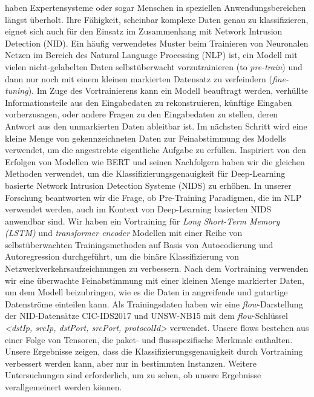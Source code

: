 \documentclass[draft,final]{vutinfth} %
\theoremstyle{break}
\begin{document}
\begin{kurzfassung}
haben Expertensysteme oder sogar Menschen in speziellen Anwendungsbereichen längst überholt. Ihre Fähigkeit, scheinbar komplexe Daten genau zu klassifizieren, eignet sich auch für den Einsatz im Zusammenhang mit Network Intrusion Detection (NID). Ein häufig verwendetes Muster beim Trainieren von Neuronalen Netzen im Bereich des Natural Language Processing (NLP) ist, ein Modell mit vielen nicht-gelabelten Daten selbstüberwacht vorzutrainieren (to \textit{pre-train}) und dann nur noch mit einem kleinen markierten Datensatz zu verfeindern (\textit{fine-tuning}). Im Zuge des Vortrainierens kann ein Modell beauftragt werden, verhüllte Informationsteile aus den Eingabedaten zu rekonstruieren, künftige Eingaben vorherzusagen, oder andere Fragen zu den Eingabedaten zu stellen, deren Antwort aus den unmarkierten Daten ableitbar ist. Im nächsten Schritt wird eine kleine Menge von gekennzeichneten Daten zur Feinabstimmung des Modells verwendet, um die angestrebte eigentliche Aufgabe zu erfüllen. Inspiriert von den Erfolgen von Modellen wie BERT und seinen Nachfolgern haben wir die gleichen Methoden verwendet, um die Klassifizierungsgenauigkeit für Deep-Learning basierte Network Intrusion Detection Systeme (NIDS) zu erhöhen. In unserer Forschung beantworten wir die Frage, ob Pre-Training Paradigmen, die im NLP verwendet werden, auch im Kontext von Deep-Learning basierten NIDS anwendbar sind. Wir haben ein Vortraining für \textit{Long Short-Term Memory (LSTM)} und \textit{transformer encoder} Modellen mit einer Reihe von selbstüberwachten Trainingsmethoden auf Basis von Autocodierung und Autoregression durchgeführt, um die binäre Klassifizierung von Netzwerkverkehrsaufzeichnungen zu verbessern. Nach dem Vortraining verwenden wir eine überwachte Feinabstimmung mit einer kleinen Menge markierter Daten, um dem Modell beizubringen, wie es die Daten in angreifende und gutartige Datenströme einteilen kann. Als Trainingsdaten haben wir eine \textit{flow}-Darstellung der NID-Datensätze CIC-IDS2017 und UNSW-NB15 mit dem \textit{flow}-Schlüssel \textit{<dstIp, srcIp, dstPort, srcPort, protocolId>} verwendet. Unsere flows bestehen aus einer Folge von Tensoren, die paket- und flussspezifische Merkmale enthalten. Unsere Ergebnisse zeigen, dass die Klassifizierungsgenauigkeit durch Vortraining verbessert werden kann, aber nur in bestimmten Instanzen. Weitere Untersuchungen sind erforderlich, um zu sehen, ob unsere Ergebnisse verallgemeinert werden können.
\end{kurzfassung}
\end{document}
